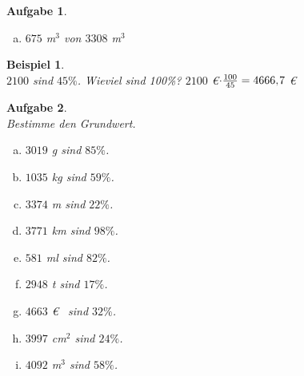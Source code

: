 \documentclass[12pt,fleqn]{article}
\theoremstyle{aufg}
\newtheorem{aufgabe}{Aufgabe}
\theoremstyle{bsp}
\newtheorem{beispiel}{Beispiel}
\begin{document}
\begin{flushleft}
\begin{aufgabe}
\begin{multicols}{3}
\begin{enumerate}[a)]
$2232$ cm$^2$ von $4105$ cm$^2$
\item 
$675$ m$^3$ von $3308$ m$^3$
\end{enumerate} 
\end{multicols} 
\end{aufgabe} 
\begin{beispiel} ~ \\ 
$2100$ sind $45\%$. Wieviel sind 100\%? $2100$ \euro$\cdot \frac{100}{45}= 4666,\hspace{-1pt}7$ \euro\end{beispiel} 
\begin{aufgabe} ~ \\ 
Bestimme den Grundwert.\begin{multicols}{3} 
\begin{enumerate}[a)] 
\item 
$3019$ g sind $85\%$.
\item 
$1035$ kg sind $59\%$.
\item 
$3374$ m sind $22\%$.
\item 
$3771$ km sind $98\%$.
\item 
$581$ ml sind $82\%$.
\item 
$2948$ t sind $17\%$.
\item 
$4663$ \euro~ sind $32\%$.
\item 
$3997$ cm$^2$ sind $24\%$.
\item 
$4092$ m$^3$ sind $58\%$.
\end{enumerate} 
\end{multicols} 
\end{aufgabe} 

\end{flushleft}
\end{document}
